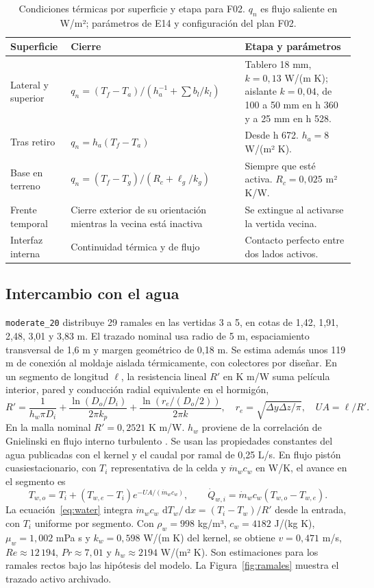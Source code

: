 \documentclass[11pt,a4paper]{article}
\newcommand{\plan}[1]{\texttt{#1}}
\newcommand{\dd}{\,\mathrm{d}}
\begin{document}
\begin{table}[htbp]
\centering\small
\caption{Condiciones térmicas por superficie y etapa para F02. $q_n$ es flujo saliente en W/m²; parámetros de E14 y configuración del plan F02.}
\label{tab:bordes}
\begin{tabularx}{\linewidth}{@{}lX X@{}}
\toprule
Superficie & Cierre & Etapa y parámetros \\
\midrule
Lateral y superior & $q_n=(T_f-T_a)/(h_a^{-1}+\sum b_l/k_l)$ & Tablero 18 mm, $k=0{,}13$ W/(m K); aislante $k=0{,}04$, de 100 a 50 mm en h 360 y a 25 mm en h 528. \\
Tras retiro & $q_n=h_a(T_f-T_a)$ & Desde h 672. $h_a=8$ W/(m² K). \\
Base en terreno & $q_n=(T_f-T_g)/(R_c+\ell_g/k_g)$ & Siempre que esté activa. $R_c=0{,}025$ m² K/W. \\
Frente temporal & Cierre exterior de su orientación mientras la vecina está inactiva & Se extingue al activarse la vertida vecina. \\
Interfaz interna & Continuidad térmica y de flujo & Contacto perfecto entre dos lados activos. \\
\bottomrule
\end{tabularx}
\end{table}

\subsection*{Intercambio con el agua}
\plan{moderate\_20} distribuye 29 ramales en las vertidas 3 a 5, en cotas de 1,42, 1,91, 2,48, 3,01 y 3,83 m. El trazado nominal usa radio de 5 m, espaciamiento transversal de 1,6 m y margen geométrico de 0,18 m. Se estima además unos 119 m de conexión al moldaje aislada térmicamente, con colectores por diseñar. En un segmento de longitud $\ell$, la resistencia lineal $R'$ en K m/W suma película interior, pared y conducción radial equivalente en el hormigón,
\begin{equation}
R'=\frac{1}{h_w\pi D_i}+\frac{\ln(D_o/D_i)}{2\pi k_p}
  +\frac{\ln(r_e/(D_o/2))}{2\pi k},\quad
r_e=\sqrt{\Delta y\Delta z/\pi},\quad UA=\ell/R'.
\label{eq:resist}
\end{equation}
En la malla nominal $R'=0{,}2521$ K m/W. $h_w$ proviene de la correlación de Gnielinski en flujo interno turbulento \cite{gnielinski}. Se usan las propiedades constantes del agua publicadas con el kernel y el caudal por ramal de 0,25 L/s. En flujo pistón cuasiestacionario, con $T_i$ representativa de la celda y $\dot m_w c_w$ en W/K, el avance en el segmento es
\begin{equation}
T_{w,o}=T_i+(T_{w,e}-T_i)e^{-UA/(\dot m_w c_w)},
\qquad \dot Q_{w,i}=\dot m_w c_w(T_{w,o}-T_{w,e}).
\label{eq:water}
\end{equation}
La ecuación~\eqref{eq:water} integra $\dot m_w c_w\,\dd T_w/\dd x=(T_i-T_w)/R'$ desde la entrada, con $T_i$ uniforme por segmento. Con $\rho_w=998$ kg/m³, $c_w=4182$ J/(kg K), $\mu_w=1{,}002$ mPa s y $k_w=0{,}598$ W/(m K) del kernel, se obtiene $v=0{,}471$ m/s, $Re\approx 12\,194$, $Pr\approx 7{,}01$ y $h_w\approx 2194$ W/(m² K). Son estimaciones para los ramales rectos bajo las hipótesis del modelo. La Figura~\ref{fig:ramales} muestra el trazado activo archivado.
\end{document}
